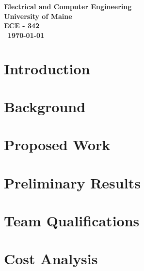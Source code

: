 \documentclass{article}
\begin{document}
\begin{titlepage}
\begin{center}
        
        \vspace{02.5cm}
        \textbf{
        Electrical and Computer Engineering\\
        University of Maine\\
        ECE - 342\\\ \today}
    \vspace{.5cm}
    
    \end{center}
\end{titlepage}


\tableofcontents

\newpage

\newpage
\listoffigures
\listoftables
\newpage 
\clearpage




\section{Introduction}

  
 
  \section{Background}
    
  
   \section{Proposed Work}
   	 
 	
    
  \section{Preliminary Results}
  	

    
  \section{Team Qualifications}
     
    
    
    
   \section{Cost Analysis}
   	
   	
\end{document}
